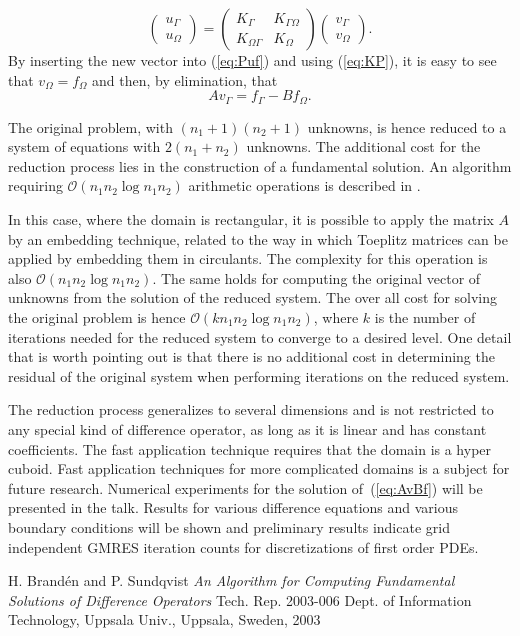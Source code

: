 \documentclass{report}
\begin{document}
\[
\left(\begin{array}{c} u_{\Gamma}\\u_{\Omega} \end{array}\right)
=\left( \begin{array}{cc} K_{\Gamma}&K_{\Gamma\Omega}\\
K_{\Omega\Gamma}&K_{\Omega} \end{array} \right)
\left(\begin{array}{c} v_{\Gamma}\\v_{\Omega} \end{array} \right).
\]
By inserting the new vector into (\ref{eq:Puf}) and using
(\ref{eq:KP}), it is easy to see that $v_{\Omega}=f_{\Omega}$ and
then, by elimination, that
\begin{equation}
\label{eq:AvBf}
Av_{\Gamma}=f_{\Gamma}-Bf_{\Omega}.
\end{equation}

The original problem, with $(n_1+1)(n_2+1)$ unknowns, is hence reduced
to a system of equations with $2(n_1+n_2)$ unknowns. The additional
cost for the reduction process lies in the construction of a
fundamental solution. An algorithm requiring $\mathcal{O}(n_1n_2\log
n_1n_2)$ arithmetic operations is described in \cite{BrSu03}.

In this case, where the domain is rectangular, it is possible to apply
the matrix $A$ by an embedding technique, related to the way in which
Toeplitz matrices can be applied by embedding them in circulants. The
complexity for this operation is also $\mathcal{O}(n_1n_2\log
n_1n_2)$. The same holds for computing the original vector of
unknowns from the solution of the reduced system. The over all cost
for solving the original problem is hence $\mathcal{O}(k n_1n_2\log
n_1n_2)$, where $k$ is the number of iterations needed for the reduced
system to converge to a desired level. One detail that is worth
pointing out is that there is no additional cost in determining the
residual of the original system when performing iterations on the
reduced system.

The reduction process generalizes to several dimensions and is not
restricted to any special kind of difference operator, as long as it
is linear and has constant coefficients. The fast application
technique requires that the domain is a hyper cuboid. Fast application
techniques for more complicated domains is a subject for future
research. Numerical experiments for the solution of~(\ref{eq:AvBf})
will be presented in the talk. Results for various difference
equations and various boundary conditions will be shown and
preliminary results indicate grid independent GMRES iteration counts
for discretizations of first order PDEs.

\begin{thebibliography}{9}
 H. Brand\'en and P. Sundqvist \emph{An Algorithm for
Computing Fundamental Solutions of Difference Operators} Tech.
Rep. 2003-006 Dept. of Information Technology, Uppsala Univ.,
Uppsala, Sweden, 2003
\end{thebibliography}
\end{document}

